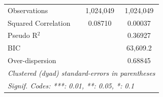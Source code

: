 \begin{tabular}{lcc}
   Observations                                                                 & 1,024,049            & 1,024,049\\  
   Squared Correlation                                                          & 0.08710              & 0.00037\\  
   Pseudo R$^2$                                                                 &                      & 0.36927\\  
   BIC                                                                          &                      & 63,609.2\\  
   Over-dispersion                                                              &                      & 0.68845\\  
   \midrule \midrule
   \multicolumn{3}{l}{\emph{Clustered (dyad) standard-errors in parentheses}}\\
   \multicolumn{3}{l}{\emph{Signif. Codes: ***: 0.01, **: 0.05, *: 0.1}}\\
\end{tabular}
\par\endgroup


